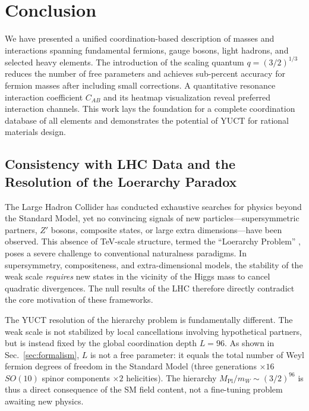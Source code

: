 \documentclass[11pt,a4paper]{article}
\begin{document}
	\section{Conclusion}
	\label{sec:conclusion}
	
	We have presented a unified coordination-based description of masses and interactions spanning fundamental fermions, gauge bosons, light hadrons, and selected heavy elements. The introduction of the scaling quantum \(q = (3/2)^{1/3}\) reduces the number of free parameters and achieves sub-percent accuracy for fermion masses after including small corrections. A quantitative resonance interaction coefficient \(C_{AB}\) and its heatmap visualization reveal preferred interaction channels. This work lays the foundation for a complete coordination database of all elements and demonstrates the potential of YUCT for rational materials design.
	
	\subsection{Consistency with LHC Data and the Resolution of the Loerarchy Paradox}
	
	The Large Hadron Collider has conducted exhaustive searches for physics beyond the Standard Model, yet no convincing signals of new particles---supersymmetric partners, $Z'$ bosons, composite states, or large extra dimensions---have been observed. This absence of TeV-scale structure, termed the ``Loerarchy Problem'' \cite{Koren2020}, poses a severe challenge to conventional naturalness paradigms. In supersymmetry, compositeness, and extra-dimensional models, the stability of the weak scale \emph{requires} new states in the vicinity of the Higgs mass to cancel quadratic divergences. The null results of the LHC therefore directly contradict the core motivation of these frameworks.
	
	The YUCT resolution of the hierarchy problem is fundamentally different. The weak scale is not stabilized by local cancellations involving hypothetical partners, but is instead fixed by the global coordination depth $L=96$. As shown in Sec.~\ref{sec:formalism}, $L$ is not a free parameter: it equals the total number of Weyl fermion degrees of freedom in the Standard Model (three generations $\times 16$ $SO(10)$ spinor components $\times 2$ helicities). The hierarchy $M_{\mathrm{Pl}}/m_W \sim (3/2)^{96}$ is thus a direct consequence of the SM field content, not a fine-tuning problem awaiting new physics.
	
\end{document}
